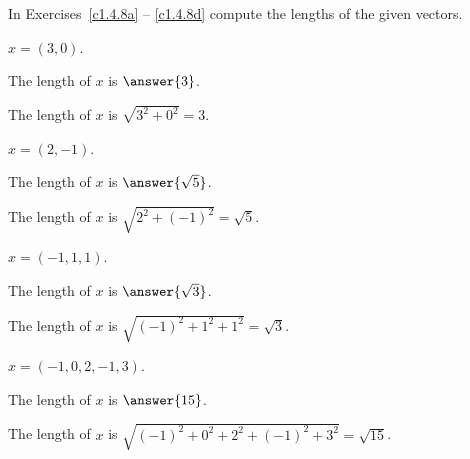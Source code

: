 \documentclass{ximera}
\begin{document}
\TEXER

\noindent In Exercises~\ref{c1.4.8a} -- \ref{c1.4.8d}
compute the lengths of the given vectors.
\begin{exercise} \label{c1.4.8a}
$x=(3,0)$.  \begin{prompt} The length of $x$ is $\answer{3}$.\end{prompt}

\begin{solution}
\ans The length of $x$ is $\sqrt{3^2 + 0^2} = 3$.

\end{solution}
\end{exercise}
\begin{exercise} \label{c1.4.8b}
$x=(2,-1)$.  \begin{prompt} The length of $x$ is $\answer{\sqrt{5}}$.\end{prompt}

\begin{solution}
\ans The length of $x$ is $\sqrt{2^2 + (-1)^2} = \sqrt{5}$.

\end{solution}
\end{exercise}
\begin{exercise} \label{c1.4.8c}
$x=(-1,1,1)$.  \begin{prompt} The length of $x$ is $\answer{\sqrt{3}}$.\end{prompt}

\begin{solution}
\ans The length of $x$ is $\sqrt{(-1)^2 + 1^2 + 1^2} =
\sqrt{3}$.

\end{solution}
\end{exercise}
\begin{exercise} \label{c1.4.8d}
$x=(-1,0,2,-1,3)$.  \begin{prompt} The length of $x$ is $\answer{15}$.\end{prompt}

\begin{solution}
\ans The length of $x$ is $\sqrt{(-1)^2 + 0^2 + 2^2 +
(-1)^2 + 3^2} = \sqrt{15}$.


\end{solution}
\end{exercise}
\end{document}
